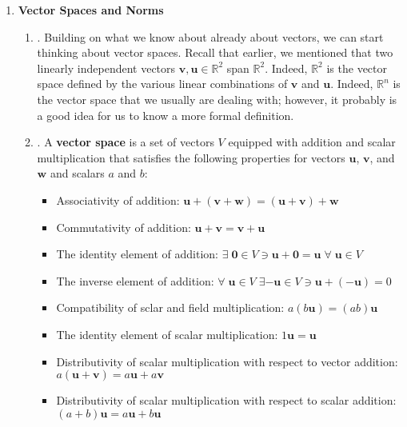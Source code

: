 \documentclass[12pt]{article}
\begin{document}
\begin{enumerate}
\item\textbf{Vector Spaces and Norms}
	\begin{enumerate}
	\item\underline{}.
		Building on what we know about already about vectors, we can start thinking about vector spaces. Recall that earlier, we mentioned that
		two linearly independent vectors $\mathbf{v},\mathbf{u}\in\mathbb{R}^2$ span $\mathbb{R}^2$. Indeed, $\mathbb{R}^2$ is the vector
		space defined by the various linear combinations of $\mathbf{v}$ and $\mathbf{u}$. Indeed, $\mathbb{R}^n$ is the vector space that
		we usually are dealing with; however, it probably is a good idea for us to know a more formal definition.



	\item\underline{}.
		A \textbf{vector space} is a set of vectors $V$ equipped with addition and scalar multiplication that satisfies the following properties
		for vectors $\mathbf{u}$, $\mathbf{v}$, and $\mathbf{w}$ and scalars $a$ and $b$:
		\begin{itemize}
		\item Associativity of addition:
				$\mathbf{u}+(\mathbf{v}+\mathbf{w})=(\mathbf{u}+\mathbf{v})+\mathbf{w}$
		\item Commutativity of addition:
				$\mathbf{u}+\mathbf{v} = \mathbf{v}+\mathbf{u}$
		\item The identity element of addition:
				$\exists\;\mathbf{0}\in V\ni \mathbf{u}+\mathbf{0}=\mathbf{u}\;\forall\;\mathbf{u}\in V$
		\item The inverse element of addition:
				$\forall\; \mathbf{u}\in V\;\exists-\mathbf{u}\in V \ni \mathbf{u}+(-\mathbf{u})=0$
		\item Compatibility of sclar and field multiplication:
				$a(b\mathbf{u})=(ab)\mathbf{u}$
		\item The identity element of scalar multiplication:
				$1\mathbf{u} = \mathbf{u}$
		\item Distributivity of scalar multiplication with respect to vector addition:
				$a(\mathbf{u}+\mathbf{v})=a\mathbf{u}+a\mathbf{v}$
		\item Distributivity of scalar multiplication with respect to scalar addition:
				$(a+b)\mathbf{u}=a\mathbf{u}+b\mathbf{u}$
		\end{itemize}


\end{enumerate}
\end{enumerate}
\end{document}
